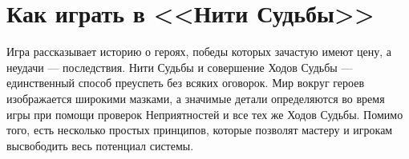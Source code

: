 \section*{Как играть в <<Нити Судьбы>>}
Игра рассказывает историю о героях, победы которых зачастую имеют цену, а неудачи — последствия. Нити Судьбы и совершение Ходов Судьбы — единственный способ преуспеть без всяких оговорок. Мир вокруг героев изображается широкими мазками, а значимые детали определяются во время игры при помощи проверок Неприятностей и все тех же Ходов Судьбы. Помимо того, есть несколько простых принципов, которые позволят мастеру и игрокам высвободить весь потенциал системы.